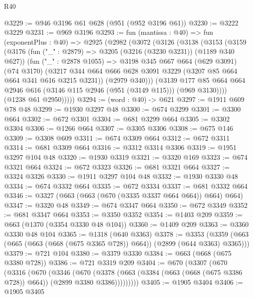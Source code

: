 \begin{lexlean}{R40}
\begin{coremodule}
@3229 := @946 @3196 @61 @628 (@951 (@952 @3196 @61))
@3230 := @3222 @3229
@3231 := @969 @3196
@3293 := fun (mantissa : @40) =>
  fun (exponentPlus : @40) =>
  @2925
    (@2982
      (@3072
        (@3126
          (@3138
            (@3153
              (@3159
                (@3176
                  (fun ("_" : @2879) => @3205 (@3216 (@3230 @3231)) (@1189 @340 @627))
                  (fun ("_" : @2878 @1055) =>
                  @3198
                    @345
                    @667
                    @664
                    (@629 @3091)
                    (@74 @3170)
                    (@3217
                      @344
                      @664
                      @666
                      @628
                      @3091
                      @3229
                      (@3207 @85 @664 @664 @341 @616 @3215 @3231))
                    (@2979 @340)))
                (@3139
                  @177
                  @85
                  @664
                  @664
                  @2946
                  @616
                  (@3146 @115 @2946 (@951 (@3149 @115)))
                  (@969 @3130))))
            (@1238 @61 @2950)))))
@3294 := (word : @40) -> @621
@3297 := @1911 @609 @78 @48
@3299 := @1930 @3297 @48
@3300 := @674 @3299
@3301 := @3300 @664
@3302 := @672 @3301
@3304 := @681 @3299 @664
@3305 := @3302 @3304
@3306 := @1266 @664
@3307 := @3305 @3306
@3308 := @675 @146
@3309 := @3308 @609
@3311 := @674 @3309 @664
@3312 := @672 @3311
@3314 := @681 @3309 @664
@3316 := @3312 @3314 @3306
@3319 := @1951 @3297 @104 @48
@3320 := @1930 @3319
@3321 := @3320 @169
@3323 := @674 @3321 @664
@3324 := @672 @3323
@3326 := @681 @3321 @664
@3327 := @3324 @3326
@3330 := @1911 @3297 @104 @48
@3332 := @1930 @3330 @48
@3334 := @674 @3332 @664
@3335 := @672 @3334
@3337 := @681 @3332 @664
@3346 := @3327 (@663 (@663 (@670 (@3335 @3337 @664 @664)) @664) @664)
@3347 := @3320 @48
@3349 := @674 @3347 @664
@3350 := @672 @3349
@3352 := @681 @3347 @664
@3353 := @3350 @3352
@3354 := @1403 @209
@3359 := @663 (@1370 (@3354 @3330 @48 @104))
@3360 := @1409 @209
@3363 := @3360 @3330 @48 @104
@3365 := @1318 (@640 @3363)
@3378 := @3353 (@3359 (@663 (@665 (@663 (@668 (@675 @3365 @728)) @664)) (@2899 (@644 @3363) @3365)))
@3379 := @721 @104
@3380 := @3379 @3330
@3384 := @663 (@668 (@675 @3380 @728))
@3386 := @721 @3319 @209
@3404 := @670
    (@3307
      (@670
        (@3316
          (@670
            (@3346
              (@670
                (@3378
                  (@663 (@3384 (@663 (@668 (@675 @3386 @728)) @664)) (@2899 @3380 @3386)))))))))
@3405 := @1905 @3404
@3406 := @1905 @3405

\end{coremodule}
\end{lexlean}

